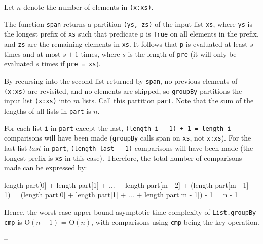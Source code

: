 \documentclass[../main.tex]{subfiles}
\begin{document}



Let $n$ denote the number of elements in \texttt{(x:xs)}.

The function \texttt{span} returns a partition \texttt{(ys, zs)} of the input list \texttt{xs}, where \texttt{ys} is the longest prefix of \texttt{xs} such that predicate \texttt{p} is \texttt{True} on all elements in the prefix, and \texttt{zs} are the remaining elements in \texttt{xs}.  It follows that \texttt{p} is evaluated at least $s$ times and at most $s + 1$ times, where $s$ is the length of \texttt{pre} (it will only be evaluated $s$ times if \texttt{pre = xs}).

By recursing into the second list returned by \texttt{span}, no previous elements of \texttt{(x:xs)} are revisited, and no elements are skipped, so \texttt{groupBy} partitions the input list \texttt{(x:xs)} into $m$ lists.  Call this partition \texttt{part}.  Note that the sum of the lengths of all lists in \texttt{part} is $n$.

For each list \texttt{i} in \texttt{part} except the last, \texttt{(length i - 1) + 1 = length i} comparisons will have been made (\texttt{groupBy} calls span on \texttt{xs}, not \texttt{x:xs}).  For the last list $last$ in \texttt{part}, \texttt{(length last - 1)} comparisons will have been made (the longest prefix is \texttt{xs} in this case).  Therefore, the total number of comparisons made can be expressed by:

\begin{code}
length part[0] + length part[1] + ... + length part[m - 2]
  + (length part[m - 1] - 1)
= (length part[0] + length part[1] + ... + length part[m - 1]) - 1
= n - 1
\end{code}

Hence, the worst-case upper-bound asymptotic time complexity of \texttt{List.groupBy cmp} is O$(n - 1)$ = O$(n)$, with comparisons using \texttt{cmp} being the key operation.
\qedsymbol

--
\end{document}
